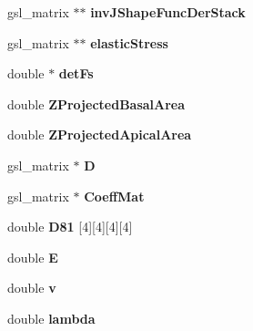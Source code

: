 \begin{DoxyCompactItemize}
\item 
\hypertarget{classShapeBase_a9478b062928ae554c25cd3269cc9e790}{}gsl\+\_\+matrix $\ast$$\ast$ {\bfseries inv\+J\+Shape\+Func\+Der\+Stack}\label{classShapeBase_a9478b062928ae554c25cd3269cc9e790}

\item 
\hypertarget{classShapeBase_acd549e0086d16194ae389ae528969596}{}gsl\+\_\+matrix $\ast$$\ast$ {\bfseries elastic\+Stress}\label{classShapeBase_acd549e0086d16194ae389ae528969596}

\item 
\hypertarget{classShapeBase_ab41f6a16647607b1c898eea1c2860367}{}double $\ast$ {\bfseries det\+Fs}\label{classShapeBase_ab41f6a16647607b1c898eea1c2860367}

\item 
\hypertarget{classShapeBase_a51a8101057e2771172a4716c128705d7}{}double {\bfseries Z\+Projected\+Basal\+Area}\label{classShapeBase_a51a8101057e2771172a4716c128705d7}

\item 
\hypertarget{classShapeBase_aa7043ddacbcd92480cb54467a2777627}{}double {\bfseries Z\+Projected\+Apical\+Area}\label{classShapeBase_aa7043ddacbcd92480cb54467a2777627}

\item 
\hypertarget{classShapeBase_a1878efccfc629e53748e8907386825b0}{}gsl\+\_\+matrix $\ast$ {\bfseries D}\label{classShapeBase_a1878efccfc629e53748e8907386825b0}

\item 
\hypertarget{classShapeBase_a7266beef6c849298c3786a53259bd467}{}gsl\+\_\+matrix $\ast$ {\bfseries Coeff\+Mat}\label{classShapeBase_a7266beef6c849298c3786a53259bd467}

\item 
\hypertarget{classShapeBase_abafc7c3b44ef3be78d4be880406bbc5f}{}double {\bfseries D81} \mbox{[}4\mbox{]}\mbox{[}4\mbox{]}\mbox{[}4\mbox{]}\mbox{[}4\mbox{]}\label{classShapeBase_abafc7c3b44ef3be78d4be880406bbc5f}

\item 
\hypertarget{classShapeBase_a6c1a3a0173841d6072a5268978463ff2}{}double {\bfseries E}\label{classShapeBase_a6c1a3a0173841d6072a5268978463ff2}

\item 
\hypertarget{classShapeBase_a8b4c2d3bfbc6c9785c5181a56f929151}{}double {\bfseries v}\label{classShapeBase_a8b4c2d3bfbc6c9785c5181a56f929151}

\item 
\hypertarget{classShapeBase_aa16b41d5791fc15531cbee067c502a5d}{}double {\bfseries lambda}\label{classShapeBase_aa16b41d5791fc15531cbee067c502a5d}


\end{DoxyCompactItemize}
